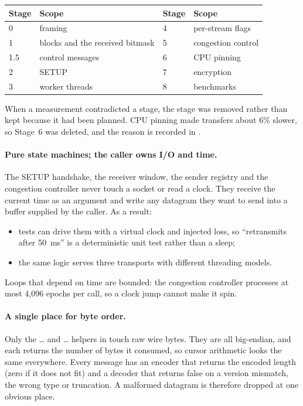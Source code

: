 \smallskip
\begin{center}\small
\begin{tabular}{@{}ll@{\qquad}ll@{}}
\toprule
\textbf{Stage} & \textbf{Scope} & \textbf{Stage} & \textbf{Scope} \\
\midrule
0 & framing & 4 & per-stream flags \\
1 & blocks and the received bitmask & 5 & congestion control \\
1.5 & control messages & 6 & CPU pinning \\
2 & SETUP & 7 & encryption \\
3 & worker threads & 8 & benchmarks \\
\bottomrule
\end{tabular}
\end{center}
\smallskip

\noindent When a measurement contradicted a stage, the stage was removed rather than kept because it had been
planned. CPU pinning made transfers about 6\% slower, so Stage~6 was deleted, and the reason is recorded in
.

\paragraph{Pure state machines; the caller owns I/O and time.} The SETUP handshake, the receiver window, the
sender registry and the congestion controller never touch a socket or read a clock. They receive the current
time as an argument and write any datagram they want to send into a buffer supplied by the caller. As a result:
\begin{itemize}
  \item tests can drive them with a virtual clock and injected loss, so ``retransmits after 50~ms'' is a
    deterministic unit test rather than a sleep;
  \item the same logic serves three transports with different threading models.
\end{itemize}
Loops that depend on time are bounded: the congestion controller processes at most 4,096 epochs per call, so a
clock jump cannot make it spin.

\paragraph{A single place for byte order.} Only the \ldots{} and
\ldots{} helpers in  touch raw wire bytes. They are all big-endian, and
each returns the number of bytes it consumed, so cursor arithmetic looks the same everywhere. Every message has
an encoder that returns the encoded length (zero if it does not fit) and a decoder that returns false on a
version mismatch, the wrong type or truncation. A malformed datagram is therefore dropped at one obvious place.

